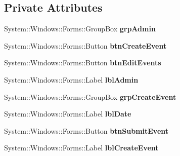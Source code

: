 \subsection*{Private Attributes}
\begin{DoxyCompactItemize}
\item 
\mbox{\label{class_project1_1_1_my_form_a43c0272038e9c26dab097c066acb2fcd}} 
System\+::\+Windows\+::\+Forms\+::\+Group\+Box {\bfseries grp\+Admin}
\item 
\mbox{\label{class_project1_1_1_my_form_a72c4f3b94347d3db0194c81c7ddfe181}} 
System\+::\+Windows\+::\+Forms\+::\+Button {\bfseries btn\+Create\+Event}
\item 
\mbox{\label{class_project1_1_1_my_form_a29d3bb1854af2434b37be2453b1327c6}} 
System\+::\+Windows\+::\+Forms\+::\+Button {\bfseries btn\+Edit\+Events}
\item 
\mbox{\label{class_project1_1_1_my_form_ab2de0d02823762a867fd8c03398f3a72}} 
System\+::\+Windows\+::\+Forms\+::\+Label {\bfseries lbl\+Admin}
\item 
\mbox{\label{class_project1_1_1_my_form_ad53f65604ff3102a67d5b8b42786d977}} 
System\+::\+Windows\+::\+Forms\+::\+Group\+Box {\bfseries grp\+Create\+Event}
\item 
\mbox{\label{class_project1_1_1_my_form_ac8078e34b0a4b040119fc07035dc3d43}} 
System\+::\+Windows\+::\+Forms\+::\+Label {\bfseries lbl\+Date}
\item 
\mbox{\label{class_project1_1_1_my_form_a070a1d6eaba7d1e4ed9c1a2f947e2138}} 
System\+::\+Windows\+::\+Forms\+::\+Button {\bfseries btn\+Submit\+Event}
\item 
\mbox{\label{class_project1_1_1_my_form_adcf829abddfc729fe02e892456976623}} 
System\+::\+Windows\+::\+Forms\+::\+Label {\bfseries lbl\+Create\+Event}
\item 
\mbox{\label{class_project1_1_1_my_form_a182f1ea658e85698bae7e6434dde9b4f}} 

\end{DoxyCompactItemize}
